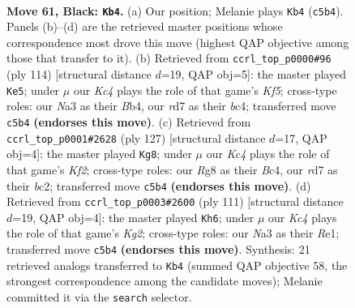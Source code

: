 \documentclass[11pt]{article}
\begin{document}
\clearpage

\begin{figure}[p]\centering
\begin{subfigure}{0.46\textwidth}\centering
\resizebox{\linewidth}{!}{%
\newchessgame
\chessboard[
  setfen={6r1/3R4/Pp6/2k2p2/B4P2/n2K4/8/8 b - - 6 61},
  showmover=false,
  pgfstyle=straightmove, color=movearrow, markmove={c5-b4}
]}
\caption{}
\end{subfigure}\hfill
\begin{subfigure}{0.46\textwidth}\centering
\resizebox{\linewidth}{!}{%
\newchessgame
\chessboard[
  setfen={1R6/5k2/2r5/5K2/1Bb1P3/1p6/1P6/8 w - - 24 58},
  showmover=false,
  pgfstyle=straightmove, color=movearrow, markmove={f5-e5}
]}
\caption{}
\end{subfigure}
\\[4pt]
\begin{subfigure}{0.46\textwidth}\centering
\resizebox{\linewidth}{!}{%
\newchessgame
\chessboard[
  setfen={8/5kp1/7p/2Bn1K2/2b4P/8/2B3P1/8 b - - 10 64},
  showmover=false,
  pgfstyle=straightmove, color=movearrow, markmove={f7-g8}
]}
\caption{}
\end{subfigure}\hfill
\begin{subfigure}{0.46\textwidth}\centering
\resizebox{\linewidth}{!}{%
\newchessgame
\chessboard[
  setfen={3R4/6k1/3K2p1/3B1p2/7P/8/8/4r3 b - - 14 56},
  showmover=false,
  pgfstyle=straightmove, color=movearrow, markmove={g7-h6}
]}
\caption{}
\end{subfigure}
\caption{\textbf{Move 61, Black: \texttt{Kb4}.} (a) Our position; Melanie plays \texttt{Kb4} (\texttt{c5b4}). Panels (b)--(d) are the retrieved master positions whose correspondence most drove this move (highest QAP objective among those that transfer to it). (b) Retrieved from \texttt{ccrl\_top\_p0000\#96} (ply 114) [structural distance $d$=19, QAP obj=5]: the master played \texttt{Ke5}; under $\mu$ our \emph{Kc4} plays the role of that game's \emph{Kf5}; cross-type roles: our \emph{N}a3 as their \emph{B}b4, our \emph{r}d7 as their \emph{b}c4; transferred move \texttt{c5b4} \textbf{(endorses this move)}. (c) Retrieved from \texttt{ccrl\_top\_p0001\#2628} (ply 127) [structural distance $d$=17, QAP obj=4]: the master played \texttt{Kg8}; under $\mu$ our \emph{Kc4} plays the role of that game's \emph{Kf2}; cross-type roles: our \emph{R}g8 as their \emph{B}c4, our \emph{r}d7 as their \emph{b}c2; transferred move \texttt{c5b4} \textbf{(endorses this move)}. (d) Retrieved from \texttt{ccrl\_top\_p0003\#2600} (ply 111) [structural distance $d$=19, QAP obj=4]: the master played \texttt{Kh6}; under $\mu$ our \emph{Kc4} plays the role of that game's \emph{Kg2}; cross-type roles: our \emph{N}a3 as their \emph{R}e1; transferred move \texttt{c5b4} \textbf{(endorses this move)}. Synthesis: 21 retrieved analogs transferred to \texttt{Kb4} (summed QAP objective 58, the strongest correspondence among the candidate moves); Melanie committed it via the \texttt{search} selector.}
\label{fig:thought-m121}
\end{figure}
\end{document}
